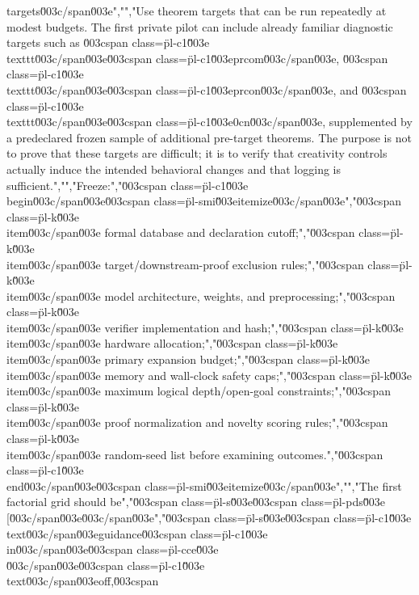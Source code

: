 {{{targets\u003c/span\u003e}","","Use theorem targets that can be run repeatedly at modest budgets. The first private pilot can include already familiar diagnostic targets such as \u003cspan class=\"pl-c1\"\u003e\\texttt\u003c/span\u003e{\u003cspan class=\"pl-c1\"\u003eprcom\u003c/span\u003e}, \u003cspan class=\"pl-c1\"\u003e\\texttt\u003c/span\u003e{\u003cspan class=\"pl-c1\"\u003eprcon\u003c/span\u003e}, and \u003cspan class=\"pl-c1\"\u003e\\texttt\u003c/span\u003e{\u003cspan class=\"pl-c1\"\u003e0cn\u003c/span\u003e}, supplemented by a predeclared frozen sample of additional pre-target theorems. The purpose is not to prove that these targets are difficult; it is to verify that creativity controls actually induce the intended behavioral changes and that logging is sufficient.","","Freeze:","\u003cspan class=\"pl-c1\"\u003e\\begin\u003c/span\u003e{\u003cspan class=\"pl-smi\"\u003eitemize\u003c/span\u003e}","\u003cspan class=\"pl-k\"\u003e\\item\u003c/span\u003e formal database and declaration cutoff;","\u003cspan class=\"pl-k\"\u003e\\item\u003c/span\u003e target/downstream-proof exclusion rules;","\u003cspan class=\"pl-k\"\u003e\\item\u003c/span\u003e model architecture, weights, and preprocessing;","\u003cspan class=\"pl-k\"\u003e\\item\u003c/span\u003e verifier implementation and hash;","\u003cspan class=\"pl-k\"\u003e\\item\u003c/span\u003e hardware allocation;","\u003cspan class=\"pl-k\"\u003e\\item\u003c/span\u003e primary expansion budget;","\u003cspan class=\"pl-k\"\u003e\\item\u003c/span\u003e memory and wall-clock safety caps;","\u003cspan class=\"pl-k\"\u003e\\item\u003c/span\u003e maximum logical depth/open-goal constraints;","\u003cspan class=\"pl-k\"\u003e\\item\u003c/span\u003e proof normalization and novelty scoring rules;","\u003cspan class=\"pl-k\"\u003e\\item\u003c/span\u003e random-seed list before examining outcomes.","\u003cspan class=\"pl-c1\"\u003e\\end\u003c/span\u003e{\u003cspan class=\"pl-smi\"\u003eitemize\u003c/span\u003e}","","The first factorial grid should be","\u003cspan class=\"pl-s\"\u003e\u003cspan class=\"pl-pds\"\u003e\\[\u003c/span\u003e\u003c/span\u003e","\u003cspan class=\"pl-s\"\u003e\u003cspan class=\"pl-c1\"\u003e\\text\u003c/span\u003e{guidance}\u003cspan class=\"pl-c1\"\u003e\\in\u003c/span\u003e\u003cspan class=\"pl-cce\"\u003e\\{\u003c/span\u003e\u003cspan class=\"pl-c1\"\u003e\\text\u003c/span\u003e{off},\u003cspan }}}

